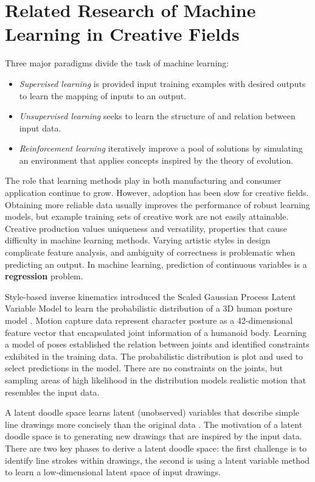 \documentclass[ %
author={Dillon Keith Diep},
supervisor={Dr. Carl Henrik Ek},
degree={MEng},
title={ART-CG Hair:},
subtitle={Assisted Real-time Content Generation of Stylised Virtual Hair},
type={Research},
year={2017} ]{dissertation}
\begin{document}
\section{Related Research of Machine Learning in Creative Fields}
Three major paradigms divide the task of machine learning:
\begin{itemize}
	\item \textit{Supervised learning} is provided input training examples with desired outputs to learn the mapping of inputs to an output.
	\item \textit{Unsupervised learning} seeks to learn the structure of and relation between input data.
	\item \textit{Reinforcement learning} iteratively improve a pool of solutions by simulating an environment that applies concepts inspired by the theory of evolution.
\end{itemize}
The role that learning methods play in both manufacturing and consumer application continue to grow. However, adoption has been slow for creative fields.  Obtaining more reliable data usually improves the performance of robust learning models, but example training sets of creative work are not easily attainable. Creative production values uniqueness and versatility, properties that cause difficulty in machine learning methods. Varying artistic styles in design complicate feature analysis, and ambiguity of correctness is problematic when predicting an output. In machine learning, prediction of continuous variables is a \textbf{regression} problem. 

Style-based inverse kinematics introduced the Scaled Gaussian Process Latent Variable Model to learn the probabilistic distribution of a 3D human posture model \cite{styleik}.  Motion capture data represent character posture as a 42-dimensional feature vector that encapsulated joint information of a humanoid body. Learning a model of poses established the relation between joints and identified constraints exhibited in the training data.  The probabilistic distribution is plot and used to select predictions in the model. There are no constraints on the joints, but sampling areas of high likelihood in the distribution models realistic motion that resembles the input data.

A latent doodle space learns latent (unobserved) variables that describe simple line drawings more concisely than the original data \cite{latentdoodle}. The motivation of a latent doodle space is to generating new drawings that are inspired by the input data. There are two key phases to derive a latent doodle space: the first challenge is to identify line strokes within drawings, the second is using a latent variable method to learn a low-dimensional latent space of input drawings.
\end{document}
